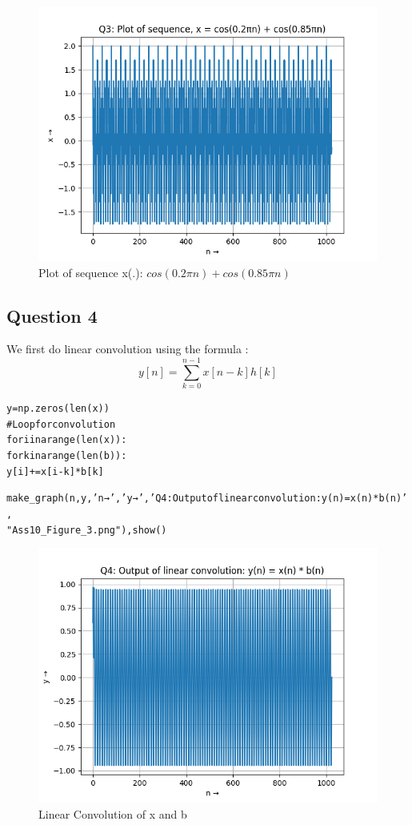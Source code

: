 \documentclass{article}
\begin{document}
\begin{figure}[h!]
\centering
\includegraphics[scale=0.6]{Ass10_Figure_2.png}
\caption{Plot of sequence x(.): $cos(0.2\pi n)+cos(0.85\pi n)$}
\label{fig:universe}
\end{figure}

\newpage
\subsection{Question 4}
We first do linear convolution using the formula :
\begin{equation}
    y[n] = \sum_{k=0}^{n-1} x[n-k]h[k]
\end{equation}
\begin{alltt}
y = np.zeros(len(x))
# Loop for convolution
for i in arange(len(x)):
    for k in arange(len(b)):
        y[i] += x[i-k]*b[k]
    
make_graph(n, y, 'n →', 'y →', 'Q4: Output of linear convolution: y(n) = x(n) * b(n)',
"Ass10_Figure_3.png"), show()
\end{alltt}

\begin{figure}[h!]
\centering
\includegraphics[scale=0.6]{Ass10_Figure_3.png}
\caption{Linear Convolution of x and b}
\label{fig:universe}
\end{figure}
\clearpage
\end{document}

